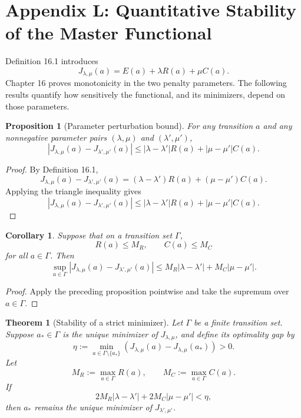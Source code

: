 \documentclass[11pt]{book}
\newtheorem*{appendixproposition}{Proposition}
\newtheorem*{appendixtheorem}{Theorem}
\newtheorem*{appendixcorollary}{Corollary}
\begin{document}
\chapter*{Appendix L: Quantitative Stability of the Master Functional}

Definition 16.1 introduces
\[
J_{\lambda,\mu}(a)
=
E(a)+\lambda R(a)+\mu C(a).
\]
Chapter 16 proves monotonicity in the two penalty parameters. The
following results quantify how sensitively the functional, and its
minimizers, depend on those parameters.

\begin{appendixproposition}[Parameter perturbation bound]
For any transition $a$ and any nonnegative parameter pairs
$(\lambda,\mu)$ and $(\lambda',\mu')$,
\[
\left|
J_{\lambda,\mu}(a)-J_{\lambda',\mu'}(a)
\right|
\leq
|\lambda-\lambda'|R(a)
+
|\mu-\mu'|C(a).
\]
\end{appendixproposition}

\begin{proof}
By Definition 16.1,
\[
J_{\lambda,\mu}(a)-J_{\lambda',\mu'}(a)
=
(\lambda-\lambda')R(a)
+
(\mu-\mu')C(a).
\]
Applying the triangle inequality gives
\[
\left|
J_{\lambda,\mu}(a)-J_{\lambda',\mu'}(a)
\right|
\leq
|\lambda-\lambda'|R(a)
+
|\mu-\mu'|C(a).
\]
\end{proof}

\begin{appendixcorollary}
Suppose that on a transition set $\Gamma$,
\[
R(a)\leq M_R,
\qquad
C(a)\leq M_C
\]
for all $a\in\Gamma$. Then
\[
\sup_{a\in\Gamma}
\left|
J_{\lambda,\mu}(a)-J_{\lambda',\mu'}(a)
\right|
\leq
M_R|\lambda-\lambda'|
+
M_C|\mu-\mu'|.
\]
\end{appendixcorollary}

\begin{proof}
Apply the preceding proposition pointwise and take the supremum over
$a\in\Gamma$.
\end{proof}

\begin{appendixtheorem}[Stability of a strict minimizer]
Let $\Gamma$ be a finite transition set. Suppose $a_\ast\in\Gamma$ is the
unique minimizer of $J_{\lambda,\mu}$, and define its optimality gap by
\[
\eta
:=
\min_{a\in\Gamma\setminus\{a_\ast\}}
\left(
J_{\lambda,\mu}(a)-J_{\lambda,\mu}(a_\ast)
\right)>0.
\]
Let
\[
M_R:=\max_{a\in\Gamma}R(a),
\qquad
M_C:=\max_{a\in\Gamma}C(a).
\]
If
\[
2M_R|\lambda-\lambda'|
+
2M_C|\mu-\mu'|
<
\eta,
\]
then $a_\ast$ remains the unique minimizer of
$J_{\lambda',\mu'}$.
\end{appendixtheorem}
\end{document}
